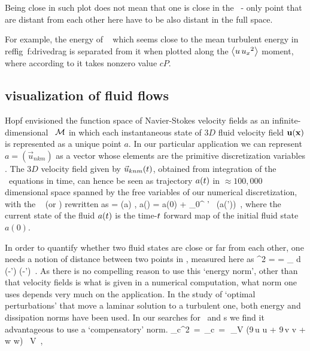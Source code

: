 Being close in such plot
does not mean that one is close in the \statesp\ - only point that are
distant from each other here have to be also distant in the full space.

For example, the energy of \reqva\  which
seems close to the
mean turbulent energy in reffig~{f:drivedrag} is separated
from it when plotted along the
$\left\langle {u \, u_{x}{}^2} \right\rangle$ moment, where according to
 it takes nonzero value $c P$.


\subsection{{\StateDsp} visualization of fluid flows}
\label{s:visualStatSp}
\renewcommand{\ssp}{a}

Hopf envisioned the function space of {Navier-Stokes} velocity fields as
an infinite-dimensional \statesp\ ${\cal M}$ in which each instantaneous state
of $3D$ fluid velocity field ${\bf u}({\bf x})$ is represented as a unique point
$\ssp$. In our particular application we can represent $\ssp =
(\vec{u}_{nkm})$ as a vector whose elements are the primitive
discretization variables . The $3D$ velocity field given
by $\vec{u}_{knm}(t)$, obtained from integration of the \NS\
equations in time, can hence be seen as trajectory $\ssp(\zeit)$ in
$\approx 100,000$ dimensional space spanned by the free variables of our
numerical discretization, with the \NSe\ %
(or \KSe)
rewritten as
\beq
   \dot{\ssp} = \vel(\ssp) ,
   \qquad
   \ssp(\zeit) = \ssp(0)
            + \int_0^\zeit \! \zeit' \, \vel(\ssp(\zeit'))
\,,
where the current state of the fluid $ \ssp(\zeit)$ is the time-$t$
forward map of the initial fluid state  $\ssp(0)$.

In order to quantify whether two fluid states are close or far from each
other, one needs a notion of distance between two points in \statesp,
measured here as
\beq
  \Norm{\ssp-\ssp'}^2  = \braket{\ssp-\ssp'}{\ssp-\ssp'} =
\int_\bCell \! d \bx \;
(-\vec{u}') \cdot (-')
\,.
As there is no compelling reason to use this {`energy norm'}, other than
that velocity fields is what is given in a numerical computation, what
norm one uses depends very much on the application. In the study of
`optimal perturbations' that move a laminar solution to a turbulent one,
both energy\rf{TeHaHe10} and dissipation\rf{LoCaCoPeGo11} norms
have been used.  In our searches for \reqva\ and \rpo s
we find it advantageous to use a `compensatory' norm.
\beq
   _c^2 \,=\, _c
   \,=\, \,\int_V (9\,u \cdot u + 9\,v \cdot v + w \cdot w)
        \, \mathrm{d}V
\,,

